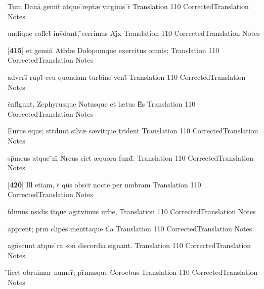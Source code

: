 \latline
  {Tum Dana\={\macron {\i}} gemit\={} atque \={}rept{\ae} virginis \={\macron {\i}}r\={}}
  { Translation }
  {110}
  { CorrectedTranslation }
  { Notes }


\latline
  {undique coll\={}ct\={\macron {\i}} inv\={}dunt, \={}cerrimus Aj\={}x}
  { Translation }
  {110}
  { CorrectedTranslation }
  { Notes }


\latline
  {[\textbf{415}] et gemin\={\macron {\i}} Atr\={\macron {\i}}d{\ae} Dolopumque exercitus omnis;}
  { Translation }
  {110}
  { CorrectedTranslation }
  { Notes }


\latline
  {advers\={\macron {\i}} rupt\={} ceu quondam turbine vent\={\macron {\i}}}
  { Translation }
  {110}
  { CorrectedTranslation }
  { Notes }


\latline
  {c\={}nfl\={\macron {\i}}gunt, Zephyrusque Notusque et l{\ae}tus E\={}\={\macron {\i}}s}
  { Translation }
  {110}
  { CorrectedTranslation }
  { Notes }


\latline
  {Eurus equ\={\macron {\i}}s; str\={\macron {\i}}dunt silv{\ae} s{\ae}vitque trident\={\macron {\i}}}
  { Translation }
  {110}
  { CorrectedTranslation }
  { Notes }


\latline
  {sp\={}meus atque \={\macron {\i}}m\={} N\={}reus ciet {\ae}quora fund\={}.}
  { Translation }
  {110}
  { CorrectedTranslation }
  { Notes }


\latline
  {[\textbf{420}] Ill\={\macron {\i}} etiam, s\={\macron {\i}} qu\={}s obsc\={}r\={} nocte per umbram}
  { Translation }
  {110}
  { CorrectedTranslation }
  { Notes }


\latline
  {f\={}dimus \={\macron {\i}}nsidi\={\macron {\i}}s t\={}t\={}que agit\={}vimus urbe,}
  { Translation }
  {110}
  { CorrectedTranslation }
  { Notes }


\latline
  {app\={}rent; pr\={\macron {\i}}m\={\macron {\i}} clipe\={}s ment\={\macron {\i}}taque t\={}la}
  { Translation }
  {110}
  { CorrectedTranslation }
  { Notes }


\latline
  {agn\={}scunt atque \={}ra son\={} discordia signant.}
  { Translation }
  {110}
  { CorrectedTranslation }
  { Notes }


\latline
  {\={}licet obruimur numer\={}; pr\={\macron {\i}}musque Coroebus}
  { Translation }
  {110}
  { CorrectedTranslation }
  { Notes }


